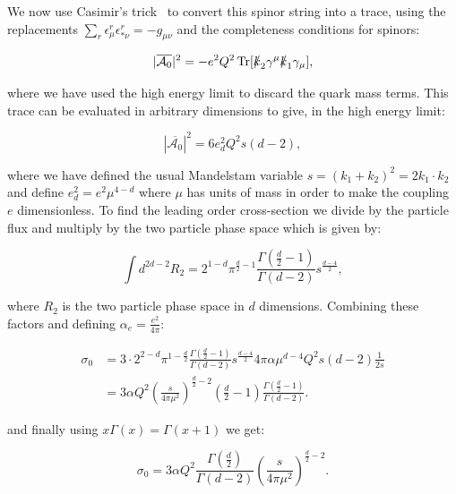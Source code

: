 			We now use Casimir's trick~\cite{griff} to convert this spinor string into a trace, using the replacements
			$\sum_r\epsilon^r_\mu\epsilon^r_{*\nu}=-g_{\mu\nu}$ and the completeness conditions for spinors:

			\begin{equation}
				|\overline{\mathcal{A}_0}|^2 = - e^2Q^2\operatorname{Tr}[\slashed k_2\gamma^\mu\slashed k_1\gamma_\mu],
			\end{equation}

			where we have used the high energy limit to discard the quark mass terms.  This trace can be evaluated in arbitrary
			dimensions to give, in the high energy limit:

			\begin{equation}
				|\overline{\mathcal{A}_0}|^2 = 6e_d^2Q^2s(d-2),
			\end{equation}

			where we have defined the usual Mandelstam variable $s=(k_1+k_2)^2=2k_1\cdot k_2$ and define $e_d^2=e^2\mu^{4-d}$ where
			$\mu$ has units of mass in order to make the coupling $e$ dimensionless.  To find the leading order cross-section we divide by the
			particle flux and multiply by the two particle phase space which is given by:

			\begin{equation}
				\int d^{2d-2}R_2 = 2^{1-d}\pi^{\frac{d}{2}-1}\frac{\Gamma(\frac{d}{2}-1)}{\Gamma(d-2)}s^\frac{d-4}{2},
			\end{equation}

			where $R_2$ is the two particle phase space in $d$ dimensions.  Combining these factors and defining $\alpha_e=\frac{e^2}{4\pi}$:

			\begin{equation}
			\begin{split}
				\sigma_0 &= 3\cdot2^{2-d}\pi^{1-\frac{d}{2}}\frac{\Gamma(\frac{d}{2}-1)}{\Gamma(d-2)}s^\frac{d-4}{2}4\pi\alpha\mu^{d-4}Q^2s(d-2)\frac{1}{2s} \\
				&= 3\alpha Q^2\left(\frac{s}{4\pi\mu^2}\right)^{\frac{d}{2}-2}\left(\frac{d}{2}-1\right)\frac{\Gamma(\frac{d}{2}-1)}{\Gamma(d-2)}.
			\end{split}
			\end{equation}

			and finally using $x\Gamma(x)=\Gamma(x+1)$ we get:

			\begin{equation}
				\sigma_0 = 3\alpha Q^2 \frac{\Gamma(\frac{d}{2})}{\Gamma(d-2)}\left(\frac{s}{4\pi\mu^2}\right)^{\frac{d}{2}-2}.
				\label{eqn:bornCrossSection}
			\end{equation}

